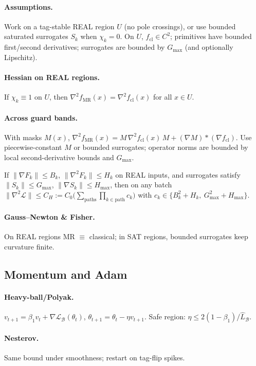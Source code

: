 \documentclass[twoside,11pt]{article}
\newcommand{\trReal}{\textsc{REAL}}
\newcommand{\TAGREAL}{\trReal}
\begin{document}
\paragraph{Assumptions.} Work on a tag-stable \TAGREAL{} region $U$ (no pole crossings), or use bounded saturated surrogates $S_k$ when $\chi_k=0$. On $U$, $f_{\mathrm{cl}}\in C^2$; primitives have bounded first/second derivatives; surrogates are bounded by $G_{\max}$ (and optionally Lipschitz).
\paragraph{Hessian on \TAGREAL{} regions.} If $\chi_k\equiv 1$ on $U$, then $\nabla^2 f_{\mathrm{MR}}(x)=\nabla^2 f_{\mathrm{cl}}(x)$ for all $x\in U$.
\paragraph{Across guard bands.} With masks $M(x)$, $\nabla^2 f_{\mathrm{MR}}(x)=M\,\nabla^2 f_{\mathrm{cl}}(x)\,M + (\nabla M)\ast(\nabla f_{\mathrm{cl}})$. Use piecewise-constant $M$ or bounded surrogates; operator norms are bounded by local second-derivative bounds and $G_{\max}$.
\begin{proposition}\label{prop:bounded-hessian}
If $\|\nabla F_k\|\le B_k$, $\|\nabla^2 F_k\|\le H_k$ on REAL inputs, and surrogates satisfy $\|S_k\|\le G_{\max}$, $\|\nabla S_k\|\le H_{\max}$, then on any batch $\|\nabla^2 \mathcal{L}\|\le C_H := C_0\big( \sum_{\text{paths}} \prod_{k\in \text{path}} c_k \big)$ with $c_k\in\{B_k^2+H_k,\ G_{\max}^2+H_{\max}\}$.
\end{proposition}
\paragraph{Gauss--Newton \& Fisher.} On \TAGREAL{} regions MR $\equiv$ classical; in SAT regions, bounded surrogates keep curvature finite.
\subsection*{Momentum and Adam}
\paragraph{Heavy-ball/Polyak.} $v_{t+1}=\beta_1 v_t+\nabla\mathcal{L}_\mathcal{B}(\theta_t)$, $\theta_{t+1}=\theta_t-\eta v_{t+1}$. Safe region: $\eta \le 2(1-\beta_1)/\widehat L_\mathcal{B}$.
\paragraph{Nesterov.} Same bound under smoothness; restart on tag-flip spikes.
\end{document}
